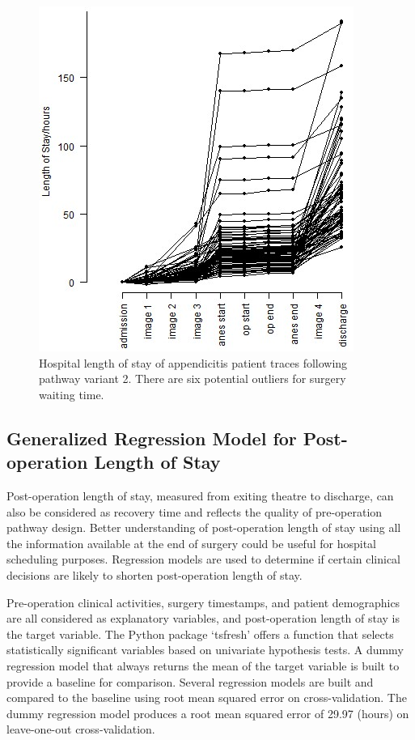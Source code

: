\documentclass{elsarticle}
\begin{document}
\begin{figure}[t]
\begin{minipage}{0.48\textwidth}
        \includegraphics[width=\textwidth]{images/appendicitis_variant_length_of_stay_2_journal.jpg}
        \caption{Hospital length of stay of appendicitis patient traces following pathway variant 2. There are six potential outliers for surgery waiting time.}
        \label{fig:appendicitis length of stay variant 2}
    \end{minipage}
\end{figure}

\subsection{Generalized Regression Model for Post-operation Length of Stay}
Post-operation length of stay, measured from exiting theatre to discharge, can also be considered as recovery time and reflects the quality of pre-operation pathway design. Better understanding of post-operation length of stay using all the information available at the end of surgery could be useful for hospital scheduling purposes. Regression models are used to determine if certain clinical decisions are likely to shorten post-operation length of stay.

Pre-operation clinical activities, surgery timestamps, and patient demographics are all considered as explanatory variables, and post-operation length of stay is the target variable. The Python package `tsfresh' \cite{Christ2018} offers a function that selects statistically significant variables based on univariate hypothesis tests. A dummy regression model that always returns the mean of the target variable is built to provide a baseline for comparison. Several regression models are built and compared to the baseline using root mean squared error on cross-validation. The dummy regression model produces a root mean squared error of 29.97 (hours) on leave-one-out cross-validation.
\end{document}
